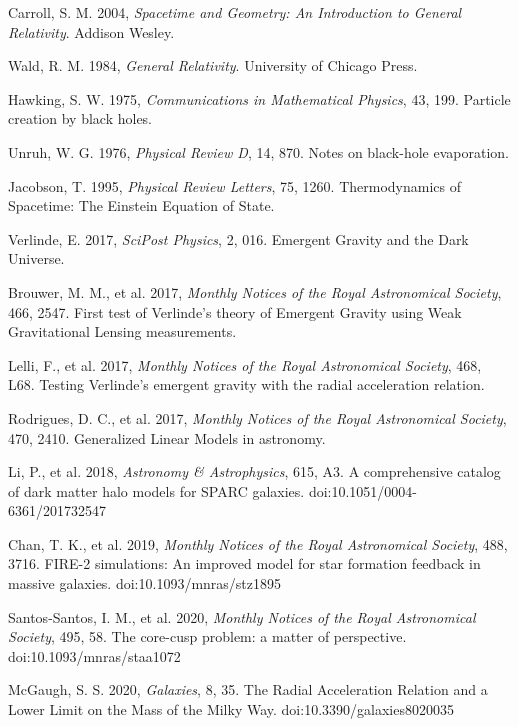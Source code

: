 \documentclass[12pt,a4paper]{article}
\begin{document}
\begin{thebibliography}{99}
 Carroll, S. M. 2004, \textit{Spacetime and Geometry: An Introduction to General Relativity}. Addison Wesley.

 Wald, R. M. 1984, \textit{General Relativity}. University of Chicago Press.

 Hawking, S. W. 1975, \textit{Communications in Mathematical Physics}, 43, 199. Particle creation by black holes.

 Unruh, W. G. 1976, \textit{Physical Review D}, 14, 870. Notes on black-hole evaporation.

 Jacobson, T. 1995, \textit{Physical Review Letters}, 75, 1260. Thermodynamics of Spacetime: The Einstein Equation of State.

 Verlinde, E. 2017, \textit{SciPost Physics}, 2, 016. Emergent Gravity and the Dark Universe.

 Brouwer, M. M., et al. 2017, \textit{Monthly Notices of the Royal Astronomical Society}, 466, 2547. First test of Verlinde's theory of Emergent Gravity using Weak Gravitational Lensing measurements.

 Lelli, F., et al. 2017, \textit{Monthly Notices of the Royal Astronomical Society}, 468, L68. Testing Verlinde's emergent gravity with the radial acceleration relation.

 Rodrigues, D. C., et al. 2017, \textit{Monthly Notices of the Royal Astronomical Society}, 470, 2410. Generalized Linear Models in astronomy.

 Li, P., et al. 2018, \textit{Astronomy \& Astrophysics}, 615, A3. A comprehensive catalog of dark matter halo models for SPARC galaxies. doi:10.1051/0004-6361/201732547

 Chan, T. K., et al. 2019, \textit{Monthly Notices of the Royal Astronomical Society}, 488, 3716. FIRE-2 simulations: An improved model for star formation feedback in massive galaxies. doi:10.1093/mnras/stz1895

 Santos-Santos, I. M., et al. 2020, \textit{Monthly Notices of the Royal Astronomical Society}, 495, 58. The core-cusp problem: a matter of perspective. doi:10.1093/mnras/staa1072

 McGaugh, S. S. 2020, \textit{Galaxies}, 8, 35. The Radial Acceleration Relation and a Lower Limit on the Mass of the Milky Way. doi:10.3390/galaxies8020035


\end{thebibliography}
\end{document}
